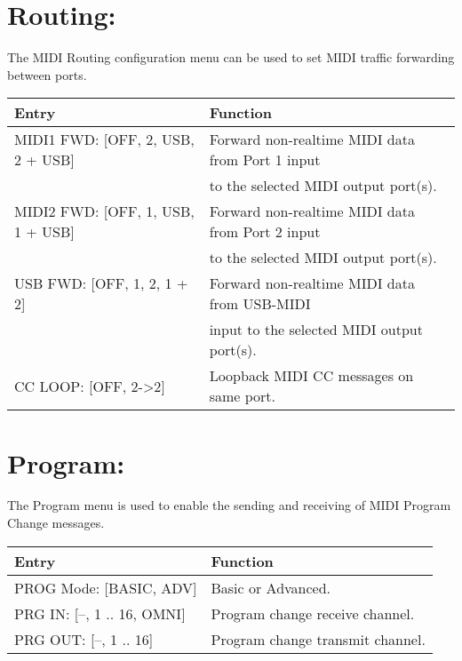 \section{Routing:}
The MIDI Routing configuration menu can be used to set MIDI traffic forwarding between ports.
\\
\begin{tabular}{|l|l|}
\hline
\rowcolor[HTML]{C0C0C0} 
Entry                                  & Function                                                                       \\ \hline
MIDI1 FWD: {[}OFF, 2, USB, 2 + USB{]}                & Forward non-realtime MIDI data from Port 1 input \\ & to the selected MIDI output port(s).                                                \\ \hline
MIDI2 FWD: {[}OFF, 1, USB, 1 + USB{]}                & Forward non-realtime MIDI data from Port 2 input \\ & to the selected MIDI output port(s).                                               \\ \hline
USB FWD: {[}OFF, 1, 2, 1 + 2{]}          & Forward non-realtime MIDI data from USB-MIDI \\ & input to the selected MIDI output port(s).                                            \\ \hline
CC LOOP: {[}OFF, 2->2{]}          & Loopback MIDI CC messages on same port.                                      \\ \hline
\end{tabular}


\newpage
\section{Program:}
The Program menu is used to enable the sending and receiving of MIDI Program Change messages.
\\
\begin{tabular}{|l|l|}
\hline
\rowcolor[HTML]{C0C0C0} 
Entry                                  & Function                                                                       \\ \hline
PROG Mode: {[}BASIC, ADV{]}                & Basic or Advanced. 
\\ \hline
PRG IN: {[}--, 1 .. 16, OMNI{]}            & Program change receive channel.                                            \\ \hline
PRG OUT: {[}--, 1 .. 16{]}          & Program change transmit channel.                                          \\ \hline
\end{tabular}

